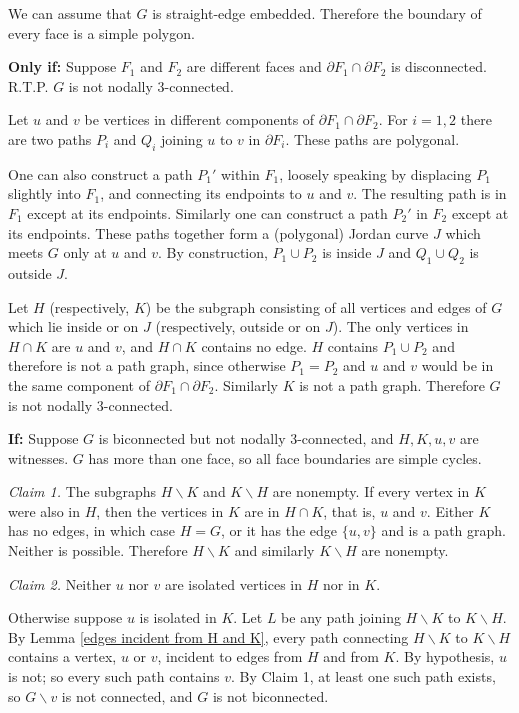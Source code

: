We can assume that $G$ is straight-edge embedded. Therefore
the boundary of every face is a simple polygon.

{\bf Only if:} Suppose $F_1$ and $F_2$ are different faces and
$\partial F_1\cap \partial F_2$ is disconnected. R.T.P.
$G$ is not nodally 3-connected.

Let
$u$ and $v$ be vertices in different components of
$\partial F_1\cap \partial F_2$.  For $i=1,2$
there are two paths $P_i$ and $Q_i$ joining
$u$ to $v$ in $\partial F_i$.  These paths
are polygonal.

One can also construct a path $P_1'$ within $F_1$, loosely speaking
by displacing $P_1$ slightly into $F_1$, and connecting its endpoints
to $u$ and $v$.  The resulting path is in
$F_1$ except at its endpoints.  Similarly one can construct
a path $P_2'$ in $F_2$ except at its endpoints.
These paths together form a (polygonal) Jordan curve $J$ which 
meets $G$ only at $u$ and $v$.  By construction, $P_1 \cup P_2$
is inside $J$ and $Q_1 \cup Q_2$ is outside $J$.

Let $H$ (respectively, $K$) be the subgraph consisting of all
vertices and edges of $G$
which lie inside or on $J$ (respectively, outside or on $J$).
The only vertices in $H\cap K$ are $u$ and $v$, and $H\cap K$
contains no edge. $H$ contains
$P_1 \cup P_2$ and therefore is not a path graph, since otherwise
$P_1 = P_2$ and $u$ and $v$ would be in the same component of
$\partial F_1 \cap \partial F_2$.
Similarly $K$ is not a path graph.  Therefore
$G$ is not nodally 3-connected.\hfil\break

{\bf If:}  Suppose $G$ is biconnected but not nodally 3-connected,
and $H,K,u,v$ are witnesses.  $G$ has more than one face,
so all face boundaries are simple cycles.

{\em Claim 1.} The subgraphs
$H\backslash K$ and $K\backslash H$ are nonempty.
If every vertex in $K$ were also in $H$,
then the vertices in $K$ are in $H\cap K$,
that is, $u$ and $v$.  Either $K$ has no
edges, in which case $H=G$, or
it has the edge $\{u,v\}$ and is a path graph.
Neither is possible.  Therefore $H\backslash K$
and similarly $K\backslash H$ are nonempty.

{\em Claim 2.} Neither $u$ nor $v$ are isolated
vertices in $H$ nor in $K$.

Otherwise suppose $u$ is isolated in $K$.
Let $L$ be any path joining $H\backslash K$ to $K\backslash H$.
By Lemma \ref{edges incident from H and K}, every
path connecting $H\backslash K$ to $K\backslash H$
contains a vertex, $u$ or $v$, incident to
edges from $H$ and from $K$.  By hypothesis, $u$
is not; so every such path contains $v$.  By
Claim 1, at least one such path exists, so
$G\backslash v$ is not connected, and $G$
is not biconnected.

